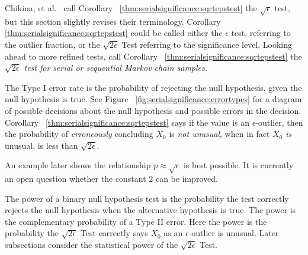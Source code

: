 \documentclass[12pt]{article}
\begin{document}
\begin{remark}
    Chikina, et al.~%
    \cite{Chikina2860} call Corollary~%
    \ref{thm:serialsignificance:sqrtepstest} the \( \sqrt{\epsilon} \)
    test, but this section slightly revises their terminology.
    Corollary~%
    \ref{thm:serialsignificance:sqrtepstest} could be called either the \(
    \epsilon \) test, referring to the outlier fraction, or the \( \sqrt
    {2 \epsilon} \) Test referring to the significance level.  Looking
    ahead to more refined tests,  call Corollary~%
    \ref{thm:serialsignificance:sqrtepstest} the \emph{ \( \sqrt{2 \epsilon} \)
    test for serial or sequential Markov chain samples.}
\end{remark}

\begin{remark}
    The Type I error rate%
    is the probability of rejecting the null hypothesis, given the null
    hypothesis is true.  See Figure~%
    \ref{fig:serialsignificance:errortypes} for a diagram of possible
    decisions about the null hypothesis and possible errors in the
    decision.  Corollary~%
    \ref{thm:serialsignificance:sqrtepstest} says if the value is an \(
    \epsilon \)-outlier, then the probability of \emph{erroneously}
    concluding \( X_0 \) is \emph{not unusual}, when in fact \( X_0 \)
    \emph{is} unusual, is less than \( \sqrt{2 \epsilon } \).

    An example later shows the relationship \( p \approx \sqrt{\epsilon}
    \) is best possible.  It is currently an open question whether the
    constant \( 2 \) can be improved.
\end{remark}

\begin{remark}
    The power%
    of a binary null hypothesis test is the probability the test
    correctly rejects the null hypothesis when the alternative
    hypothesis is true.  The power is the complementary probability of a
    Type II error.  Here the power is the probability the \( \sqrt{2\epsilon}
    \) Test correctly says \( X_0 \) as an \( \epsilon \)-outlier is
    unusual.  Later subsections consider the statistical power of the \(
    \sqrt{2\epsilon} \) Test.
\end{remark}
\end{document}
